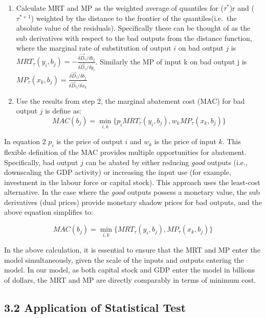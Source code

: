 \documentclass[
  10pt,
]{article}
\begin{document}
\begin{enumerate}
\def\labelenumi{\arabic{enumi}.}
\setcounter{enumi}{1}
\item
  Calculate MRT and MP as the weighted average of quantiles for
  (\(\tau^{*}\))r and (\(\tau^{*+1}\)) weighted by the distance to the
  frontier of the quantiles(i.e.~the absolute value of the residuals).
  Specifically these can be thought of as the sub derivatives with
  respect to the bad outputs from the distance function, where the
  marginal rate of substitution of output \(i\) on bad output \(j\) is
  \(MRT_{\tau}(y_{i},b_{j})=-\frac{\delta \vec{D}_{\tau}/\delta b_{j}}{\delta \vec{D}_{\tau}/\delta y_{i}}\).
  Similarly the MP of input k on bad output j is
  \(MP_{\tau}(x_{k},b_{j})=\frac{\delta \vec{D}_{\tau}/\delta b_{j}}{\delta \vec{D}_{\tau}/\delta x_{k}}\)
\item
  Use the results from step 2, the marginal abatement cost (MAC) for bad
  output \(j\) is define as: \begin{equation}
  MAC(b_{j})=\displaystyle \min_{i,k}\{p_{i}MRT_{\tau}(y_{i},b_{j}), w_{k}MP_{\tau}(x_{k},b_{j})\}
  \end{equation}
\end{enumerate}

In equation 2 \(p_{i}\) is the price of output \(i\) and \(w_{k}\) is
the price of input \(k\). This flexible definition of the MAC provides
multiple opportunities for abatement. Specifically, bad output \(j\) can
be abated by either reducing \emph{good} outputs (i.e., downscaling the
GDP activity) or increasing the input use (for example, investment in
the labour force or capital stock). This approach uses the least-cost
alternative. In the case where the \emph{good} outputs possess a
monetary value, the sub derivatives (dual prices) provide monetary
shadow prices for bad outputs, and the above equation simplifies to:

\begin{equation}
MAC(b_{j})=\displaystyle \min_{i,k}\{MRT_{\tau}(y_{i},b_{j}), MP_{\tau}(x_{k},b_{j})\} 
\end{equation}

In the above calculation, it is essential to ensure that the MRT and MP
enter the model simultaneously, given the scale of the inputs and
outputs entering the model. In our model, as both capital stock and GDP
enter the model in billions of dollars, the MRT and MP are directly
comparably in terms of minimum cost.

\hypertarget{application-of-statistical-test}{%
\subsection{3.2 Application of Statistical
Test}\label{application-of-statistical-test}}
\end{document}
